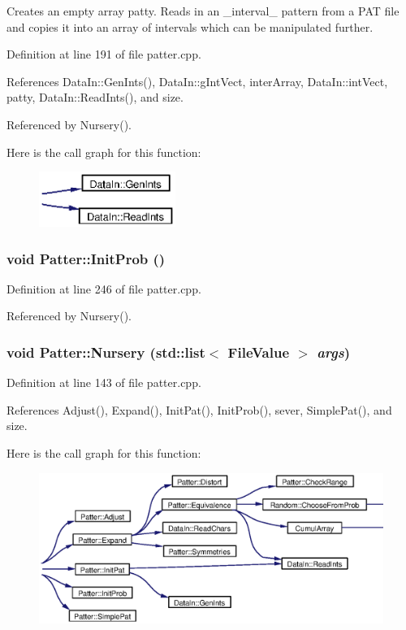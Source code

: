 Creates an empty array patty. Reads in an \_\-interval\_\- pattern from a PAT file and copies it into an array of intervals which can be manipulated further. 

Definition at line 191 of file patter.cpp.

References Data\-In::Gen\-Ints(), Data\-In::g\-Int\-Vect, inter\-Array, Data\-In::int\-Vect, patty, Data\-In::Read\-Ints(), and size.

Referenced by Nursery().

Here is the call graph for this function:\begin{figure}[H]
\begin{center}
\leavevmode
\includegraphics[width=126pt]{classPatter_d0_cgraph}
\end{center}
\end{figure}
\subsubsection{\setlength{\rightskip}{0pt plus 5cm}void Patter::Init\-Prob ()\hspace{0.3cm}{\tt  [private]}}\label{classPatter_d3}




Definition at line 246 of file patter.cpp.

Referenced by Nursery().
\subsubsection{\setlength{\rightskip}{0pt plus 5cm}void Patter::Nursery (std::list$<$ {\bf File\-Value} $>$ {\em args})}\label{classPatter_a6}




Definition at line 143 of file patter.cpp.

References Adjust(), Expand(), Init\-Pat(), Init\-Prob(), sever, Simple\-Pat(), and size.

Here is the call graph for this function:\begin{figure}[H]
\begin{center}
\leavevmode
\includegraphics[width=384pt]{classPatter_a6_cgraph}
\end{center}
\end{figure}
